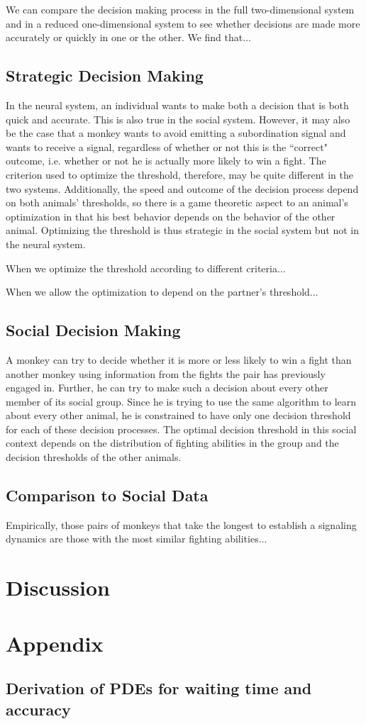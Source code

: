 \documentclass{article}
\begin{document}
We can compare the decision making process in the full two-dimensional system and in a reduced one-dimensional system to see whether decisions are made more accurately or quickly in one or the other. We find that...

\subsection{Strategic Decision Making }
In the neural system, an individual wants to make both a decision that is both quick and accurate.  This is also true in the social system.  However, it may also be the case that a monkey wants to avoid emitting a subordination signal and wants to receive a signal, regardless of whether or not this is the ``correct" outcome, i.e. whether or not he is actually more likely to win a fight.  The criterion used to optimize the threshold, therefore, may be quite different in the two systems.  Additionally, the speed and outcome of the decision process depend on both animals' thresholds, so there is a game theoretic aspect to an animal's optimization in that his best behavior depends on the behavior of the other animal. Optimizing the threshold is thus strategic in the social system but not in the neural system.  

When we optimize the threshold according to different criteria...

When we allow the optimization to depend on the partner's threshold...


\subsection{Social Decision Making }
A monkey can try to decide whether it is more or less likely to win a fight than another monkey using information from the fights the pair has previously engaged in.  Further, he can try to make such a decision about every other member of its social group.  Since he is trying to use the same algorithm to learn about every other animal, he is constrained to have only one decision threshold for each of these decision processes.  The optimal decision threshold in this social context depends on the distribution of fighting abilities in the group and the decision thresholds of the other animals. 

\subsection{Comparison to Social Data }
Empirically, those pairs of monkeys that take the longest to establish a signaling dynamics are those with the most similar fighting abilities...

\section{Discussion}


\section{Appendix}

\subsection{Derivation of PDEs for waiting time and accuracy}

\nocite{*}


\end{document}
